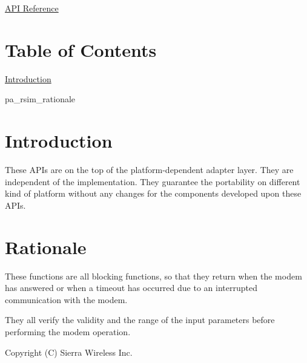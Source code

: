 \hyperlink{pa__rsim_8h}{A\+PI Reference}



\hypertarget{c_pa_rsim_pa_rsim_toc}{}\section{Table of Contents}\label{c_pa_rsim_pa_rsim_toc}

\begin{DoxyItemize}
\item \hyperlink{c_pa_rsim_pa_rsim_intro}{Introduction}
\item pa\+\_\+rsim\+\_\+rationale
\end{DoxyItemize}\hypertarget{c_pa_rsim_pa_rsim_intro}{}\section{Introduction}\label{c_pa_rsim_pa_rsim_intro}
These A\+P\+Is are on the top of the platform-\/dependent adapter layer. They are independent of the implementation. They guarantee the portability on different kind of platform without any changes for the components developed upon these A\+P\+Is.\hypertarget{c_pa_rsim_pa_rsim_rational}{}\section{Rationale}\label{c_pa_rsim_pa_rsim_rational}
These functions are all blocking functions, so that they return when the modem has answered or when a timeout has occurred due to an interrupted communication with the modem.

They all verify the validity and the range of the input parameters before performing the modem operation.





Copyright (C) Sierra Wireless Inc. 